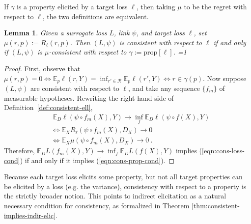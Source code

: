 \documentclass{article}
\newcommand{\Comments}{1}
\newcommand{\mytodo}[2]{\ifnum\Comments=1%
	\todo[linecolor=#1!80!black,backgroundcolor=#1,bordercolor=#1!80!black]{#2}\fi}
\newcommand{\btw}[1]{\mytodo{gray!10!white}{\textcolor{gray}{BTW: #1}}}%
\newcommand{\reals}{\mathbb{R}}
\newcommand{\simplex}{\Delta_\Y}
\newcommand{\prop}[1]{\mathrm{prop}[#1]}
\newcommand{\propdis}{\mu}
\newcommand{\E}{\mathbb{E}}
\newcommand{\R}{\mathcal{R}}
\newcommand{\Y}{\mathcal{Y}}
\newcommand{\exploss}[3]{\E_{#3} #1(#2,Y)}
\newtheorem{lemma}{Lemma}
\begin{document}
If $\gamma$ is a property elicited by a target loss $\ell$, then taking $\propdis$ to be the regret with respect to $\ell$, the two definitions are equivalent. %
\begin{lemma}\label{lem:consistent-loss-implies-prop}
	Given a surrogate loss $L$, link $\psi$, and target loss $\ell$, set
  $\mu(r,p) := R_\ell(r,p)$.
  Then
	$(L, \psi)$ is consistent with respect to $\ell$ if and only if $(L,\psi)$ is $\propdis$-consistent with respect to $\gamma := \prop{\ell}$.
  \btw{Note: don't actually need $\gamma$ nonempty here.}
\end{lemma}
\begin{proof}
	First, observe that $\propdis(r,p) = 0 \iff \exploss{\ell}{r}{p} = \inf_{r' \in \R} \exploss{\ell}{r'}{p} \iff r \in \gamma(p)$.
	Now suppose $(L, \psi)$ are consistent with respect to $\ell$, and take any sequence $\{f_m\}$ of measurable hypotheses.
  Rewriting the right-hand side of Definition~\ref{def:consistent-ell},
        \begin{align}
	  &\; \E_D \ell(\psi \circ f_m(X), Y)\to \inf_f \E_D \ell(\psi \circ f(X), Y)   \label{eqn:cons-loss-cond} \\
	  &\iff \E_X R_\ell(\psi \circ f_m(X), D_X) \to 0                               \nonumber  \\
	  &\iff \E_X \propdis(\psi \circ f_m(X), D_X) \to 0~.~                          \label{eqn:cons-prop-cond}
	\end{align}
        Therefore, $\mathbb{E}_D L(f_m(X),Y) \to \inf_f \mathbb{E}_D L(f(X),Y)$ implies (\ref{eqn:cons-loss-cond}) if and only if it implies (\ref{eqn:cons-prop-cond}).
\end{proof}

Because each target loss elicits some property, but not all target properties can be elicited by a loss (e.g. the variance), consistency with respect to a property is the strictly broader notion.
This points to indirect elicitation as a natural necessary condition for consistency, as formalized in Theorem \ref{thm:consistent-implies-indir-elic}.
\end{document}
